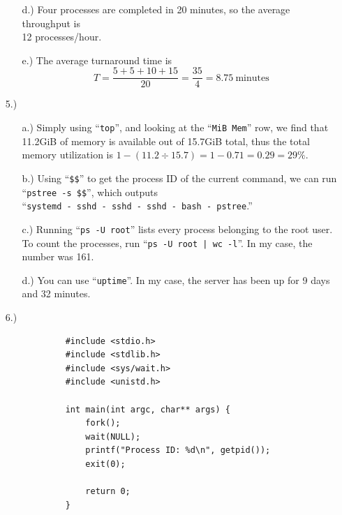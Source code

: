 \documentclass[12pt]{article}
\begin{document}
\begin{itemize}
\begin{itemize}
            \item [d.)] Four processes are completed in 20 minutes, so the
            average throughput is \\ 12 processes/hour.

            \item [e.)] The average turnaround time is
            \[
                T
                = \frac{5 + 5 + 10 + 15}{20}
                = \frac{35}{4}
                = 8.75\ \text{minutes}
            \]
        \end{itemize}

        \item [5.)] \begin{itemize}
            \item [a.)] Simply using ``\verb|top|'', and looking at the
            ``\verb|MiB Mem|'' row, we find that 11.2GiB of memory is available
            out of 15.7GiB total, thus the total memory utilization is
            $1 - (11.2 \div 15.7) = 1 - 0.71 = 0.29 = 29\%$.

            \item [b.)] Using ``\verb|$$|'' to get the process ID of the
            current command, we can run \\ ``\verb|pstree -s $$|'', which
            outputs \\
            ``\verb|systemd - sshd - sshd - sshd - bash - pstree|.''

            \item [c.)] Running ``\verb|ps -U root|'' lists every process
            belonging to the root user.
            To count the processes, run ``\verb=ps -U root | wc -l=''.
            In my case, the number was 161.

            \item [d.)] You can use ``\verb|uptime|''.
            In my case, the server has been up for 9 days and 32 minutes.
        \end{itemize}

        \item [6.)] \begin{verbatim}
            #include <stdio.h>
            #include <stdlib.h>
            #include <sys/wait.h>
            #include <unistd.h>

            int main(int argc, char** args) {
                fork();
                wait(NULL);
                printf("Process ID: %d\n", getpid());
                exit(0);

                return 0;
            }
        \end{verbatim}
    \end{itemize}
\end{document}

